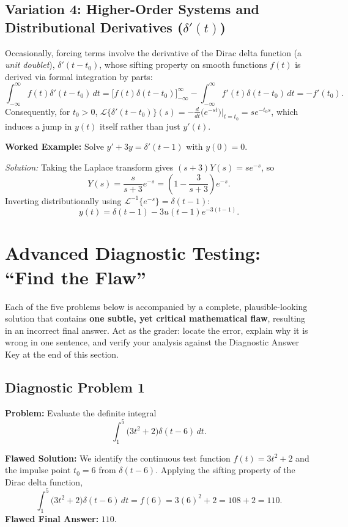 \documentclass[11pt, letterpaper]{article}
\theoremstyle{definition}
\theoremstyle{remark}
\begin{document}
\subsection{Variation 4: Higher-Order Systems and Distributional Derivatives ($\delta'(t)$)}
Occasionally, forcing terms involve the derivative of the Dirac delta function (a \emph{unit doublet}), $\delta'(t - t_0)$, whose sifting property on smooth functions $f(t)$ is derived via formal integration by parts:
\[
    \int_{-\infty}^{\infty} f(t)\delta'(t - t_0)\,dt = \bigl[f(t)\delta(t - t_0)\bigr]_{-\infty}^{\infty} - \int_{-\infty}^{\infty} f'(t)\delta(t - t_0)\,dt = -f'(t_0).
\]
Consequently, for $t_0 > 0$, $\mathcal{L}\{\delta'(t - t_0)\}(s) = -\frac{d}{dt}\bigl(e^{-st}\bigr)\big|_{t=t_0} = s e^{-t_0 s}$, which induces a jump in $y(t)$ itself rather than just $y'(t)$.

\textbf{Worked Example:} Solve $y' + 3y = \delta'(t - 1)$ with $y(0) = 0$.

\emph{Solution:} Taking the Laplace transform gives $(s + 3)Y(s) = s e^{-s}$, so
\[
    Y(s) = \frac{s}{s + 3}e^{-s} = \left(1 - \frac{3}{s + 3}\right)e^{-s}.
\]
Inverting distributionally using $\mathcal{L}^{-1}\{e^{-s}\} = \delta(t - 1)$:
\[
    y(t) = \delta(t - 1) - 3u(t - 1)e^{-3(t - 1)}.
\]

\newpage

\section{Advanced Diagnostic Testing: ``Find the Flaw''}

Each of the five problems below is accompanied by a complete, plausible-looking solution that contains \textbf{one subtle, yet critical mathematical flaw}, resulting in an incorrect final answer. Act as the grader: locate the error, explain why it is wrong in one sentence, and verify your analysis against the Diagnostic Answer Key at the end of this section.

\subsection{Diagnostic Problem 1}
\textbf{Problem:} Evaluate the definite integral
\[
    \int_{1}^{5} \bigl(3t^2 + 2\bigr)\delta(t - 6)\,dt.
\]

\textbf{Flawed Solution:}
We identify the continuous test function $f(t) = 3t^2 + 2$ and the impulse point $t_0 = 6$ from $\delta(t - 6)$. Applying the sifting property of the Dirac delta function,
\[
    \int_{1}^{5} \bigl(3t^2 + 2\bigr)\delta(t - 6)\,dt = f(6) = 3(6)^2 + 2 = 108 + 2 = 110.
\]
\textbf{Flawed Final Answer:} $110$.
\end{document}

